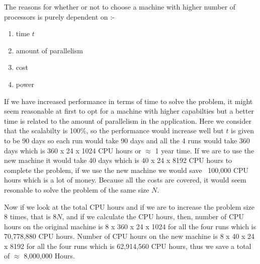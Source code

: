 \documentclass[fleqn,letterpaper,12pt]{report}
\begin{document}
The reasons for whether or not to choose a machine with higher number of processors is purely dependent on :-
\begin{enumerate}
\item time $t$ 
\item amount of parallelism 
\item cost 
\item power
\end{enumerate}
If we have increased performance in terms of time to solve the problem, it might seem reasonable at first to opt for a machine with higher capabilties but a better time is related to the amount of parallelism in the application. Here we consider that the scalabilty is 100\%, so the performance would increase well but $t$ is given to be 90 days so each run  would take 90 days and all the 4 runs would take 360 days which is 360 x 24 x 1024 CPU hours or $\approx$ 1 year time. If we are to use the new machine it would take 40 days which is 40 x 24 x 8192 CPU hours to complete the problem, if we use the new machine we would save ~100,000 CPU hours which is a lot of money.  Because all the costs are covered, it would seem resonable to solve the problem of the same size $N$. 

Now if we look at the total CPU hours and if we are to increase the problem size 8 times, that is $8N$, and if we calculate the CPU hours, then, number of CPU hours on the original machine is 8 x 360 x 24 x 1024 for all the four runs which is 70,778,880 CPU hours. Number of CPU hours on the new machine is 8 x 40 x 24 x 8192 for all the four runs which is 62,914,560 CPU hours, thus we save a total of $\approx$ 8,000,000 Hours.
\end{document}
